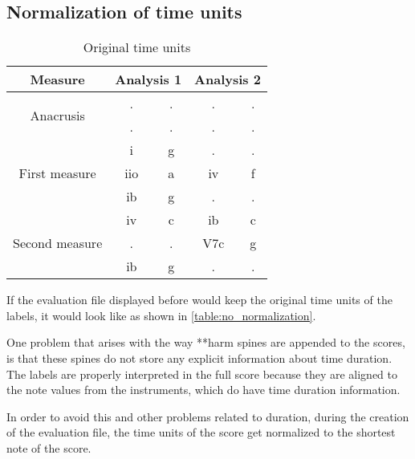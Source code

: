   \subsection{Normalization of time units}

	\begin{table}[tbp]
	\centering
	\begin{tabular}{|c|c|c|c|c|}
	\hline
	Measure & \multicolumn{2}{c|}{Analysis 1} & \multicolumn{2}{c|}{Analysis 2} \\ \hline
	\multirow{2}{*}{Anacrusis} & . & . & . & . \\ \cline{2-5}
	 & . & . & . & . \\ \hline
	\multirow{3}{*}{First measure} & i & g & . & . \\ \cline{2-5}
	 & iio & a & iv & f \\ \cline{2-5}
	 & ib & g & . & . \\ \hline
	\multirow{3}{*}{Second measure} & iv & c & ib & c \\ \cline{2-5}
	 & . & . & V7c & g \\ \cline{2-5}
	 & ib & g & . & . \\ \hline
	\end{tabular}
	\caption{Original time units}
	\label{table:no_normalization}
	\end{table}

	If the evaluation file displayed before would keep the original time units of the labels, it would look like as shown in \autoref{table:no_normalization}.

	One problem that arises with the way **harm spines are appended to the scores, is that these spines do not store any explicit information about time duration. The labels are properly interpreted in the full score because they are aligned to the note values from the instruments, which do have time duration information.

	In order to avoid this and other problems related to duration, during the creation of the evaluation file, the time units of the score get normalized to the shortest note of the score.

